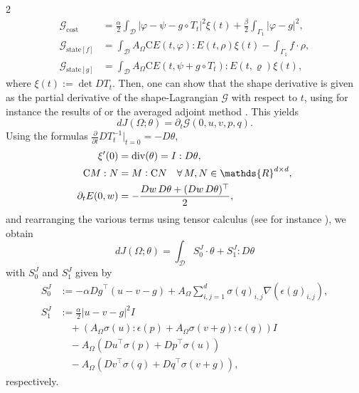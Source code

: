\documentclass[a4paper, oneside]{article}
\begin{document}
\begin{multicols}{2}
\begin{align*}
	\mathcal{G}_{\mathrm{cost}}     &= \frac{\alpha}{2}\int_{\mathcal{D}}\left|\varphi-\psi-g\circ T_{t}\right|^{2}\xi(t)+\frac{\beta}{2}\int_{\Gamma_{1}}\left|\varphi-g\right|^{2}, \\
	\mathcal{G}_{\mathrm{state}[f]} &= \int_{\mathcal{D}}A_{\Omega}\mathrm{C}E(t,\varphi):E(t,\rho)\xi(t)-\int_{\Gamma_{1}}f\cdot\rho, \\
	\mathcal{G}_{\mathrm{state}[g]} &= \int_{\mathcal{D}}A_{\Omega}\mathrm{C}E(t,\psi + g\circ T_{t}):E(t,\varrho)\xi(t),
\end{align*}
where $\xi(t):=\det DT_t$.
Then, one can show that the shape derivative is given as the partial derivative of the shape-Lagrangian $\mathcal{G}$ with respect to $t$, using for instance the results of \cite[Chapter~10, Section~5.4]{MR2731611} or the averaged adjoint method \cite{MR3535238}.
This yields
\begin{equation}
	dJ(\Omega; \theta) = \partial_{t}\mathcal{G}(0, u, v, p, q).
\end{equation}
Using the formulas $\frac{\partial}{\partial t} DT_{t}^{-1}|_{t=0} =-D\theta$,   
\begin{align*}
	\xi'(0) & = \operatorname{div}(\theta) = I : D\theta,\\
	\mathrm{C}M:N &= M\vcentcolon\mathrm{C}N \quad \forall\,M,N\in\mathds{R}^{d\times d},\\
	\partial_t E(0,w) &= -\frac{Dw\,D\theta + (Dw\,D\theta)^\top}{2},
\end{align*}
and rearranging the various terms using tensor calculus (see for instance \cite[Lemma 2.2]{MR4531392}), we obtain
\begin{equation}\label{eq:SDelast_inv}
	dJ(\Omega; \theta) = \int_{\mathcal{D}} S_0^J \cdot \theta + S_1^J : D\theta 
\end{equation}
with $S_0^J$ and $S_1^J$ given by
\begin{align*}
	S^{J}_{0} & := -\alpha{Dg}^{\top}(u - v - g) +
	A_{\Omega}\sum_{i,j=1}^{d}{\sigma (q)}_{i,j}\nabla(\epsilon(g)_{i,j}),\\
	S^{J}_{1} & := \frac{\alpha}{2}{|u-v-g|}^2 I\\
			  & \quad + \left(A_{\Omega}\sigma(u):\epsilon(p) + A_{\Omega}\sigma(v+g):\epsilon(q)\right)I\\
			  & \quad - A_{\Omega} \left({Du}^{\top}\sigma(p) + {Dp}^{\top}\sigma(u)\right)\\
			  & \quad - A_{\Omega} \left({Dv}^{\top}\sigma(q) + {Dq}^{\top}\sigma(v+g)\right),
\end{align*}
respectively.



\end{multicols}
\end{document}
